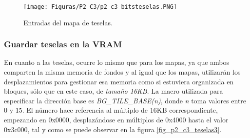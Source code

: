 \begin{figure}[t]
\centering
\texttt{[image: Figuras/P2\_C3/p2\_c3\_bitsteselas.PNG]}
\caption{Entradas del mapa de teselas.}
\label{fig_p2_c3_entmapateselas}
\end{figure}

\subsubsection{Guardar teselas en la VRAM}
En cuanto a las teselas, ocurre lo mismo que para los mapas, ya que ambos comparten la misma memoria de fondos y al igual que los mapas, utilizarán los desplazamientos para gestionar esa memoria como si estuviera organizada en bloques, sólo que en este caso, de \textit{tamaño 16KB}. La macro utilizada para especificar la dirección base es \textit{BG\_TILE\_BASE(n)}, donde \textit{n} toma valores entre 0 y 15. El número hace referencia al múltiplo de 16KB correspondiente, empezando en 0x0000, desplazándose en múltiplos de 0x4000 hasta el valor 0x3c000, tal y como se puede observar en la figura \ref{fig_p2_c3_teselas3}. 










